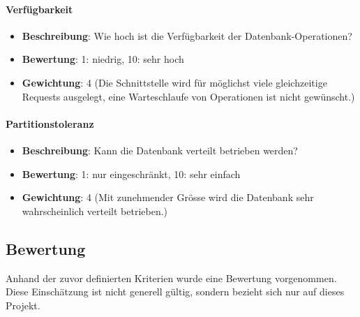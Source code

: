 \paragraph{Verfügbarkeit}
\begin{itemize}
	\item \textbf{Beschreibung}: Wie hoch ist die Verfügbarkeit der Datenbank-Operationen?
	\item \textbf{Bewertung}: 1: niedrig, 10: sehr hoch
	\item \textbf{Gewichtung}: 4 (Die Schnittstelle wird für möglichst viele gleichzeitige Requests ausgelegt, eine Warteschlaufe von Operationen ist nicht gewünscht.)
\end{itemize}

\paragraph{Partitionstoleranz}
\begin{itemize}
	\item \textbf{Beschreibung}: Kann die Datenbank verteilt betrieben werden?
	\item \textbf{Bewertung}: 1: nur eingeschränkt, 10: sehr einfach
	\item \textbf{Gewichtung}: 4 (Mit zunehmender Grösse wird die Datenbank sehr wahrscheinlich verteilt betrieben.)
\end{itemize}

\newpage
\subsection{Bewertung}\label{architektur_bewertung}
Anhand der zuvor definierten Kriterien wurde eine Bewertung vorgenommen. Diese Einschätzung ist nicht generell gültig, sondern bezieht sich nur auf dieses Projekt.

